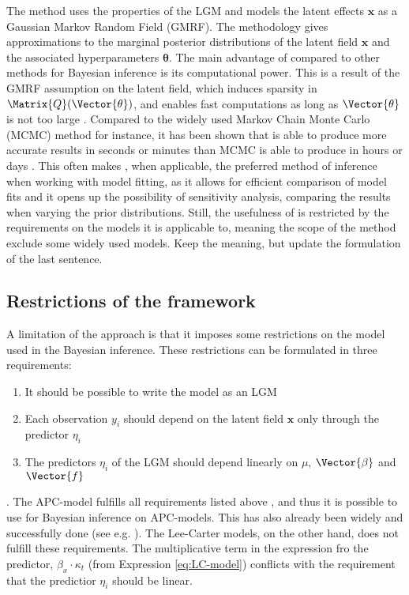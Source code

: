 \newpar The \inla method uses the properties of the LGM and models the latent effects $\mathbf{x}$ as a Gaussian Markov Random Field (GMRF). The methodology gives approximations to the marginal posterior distributions of the latent field $\mathbf{x}$ and the associated hyperparameters $\boldsymbol{\theta}$. The main advantage of \inla compared to other methods for Bayesian inference is its computational power. This is a result of the GMRF assumption on the latent field, which induces sparsity in $\Matrix{Q}(\Vector{\theta})$, and enables fast computations as long as $\Vector{\theta}$ is not too large \parencite{martinoRiebler2019}. Compared to the widely used Markov Chain Monte Carlo (MCMC) method for instance, it has been shown that \inla is able to produce more accurate results in seconds or minutes than MCMC is able to produce in hours or days \parencite{rue2009inla}.
This often makes \inla, when applicable, the preferred method of inference when working with model fitting, as it allows for efficient comparison of model fits and it opens up the possibility of sensitivity analysis, comparing the results when varying the prior distributions. Still, the usefulness of \inla is restricted by the requirements on the models it is applicable to, meaning the scope of the \inla method exclude some widely used models. \textcolor{myDarkGreen}{Keep the meaning, but update the formulation of the last sentence. }

\subsection{Restrictions of the \inla framework}
\label{sec:InlaRestrictions}
A limitation of the \inla approach is that it imposes some restrictions on the model used in the Bayesian inference. These restrictions can be formulated in three requirements:
\begin{enumerate}
    \item It should be possible to write the model as an LGM
    \item Each observation $y_i$ should depend on the latent field $\textbf{x}$ only through the predictor $\eta_i$ 
    \item The predictors $\eta_i$ of the LGM should depend linearly on $\mu$, $\Vector{\beta}$ and $\Vector{f}$
    \label{item:inlaRequirements}
\end{enumerate}
\parencite{martinoRiebler2019}.
\newpar The APC-model fulfills all requirements listed above \parencite{rieblerHeld2010}, and thus it is possible to use \inla for Bayesian inference on APC-models. This has also already been widely and successfully done (see e.g. \textcite{RieblerThesis2010}). The Lee-Carter models, on the other hand, does not fulfill these requirements. The multiplicative term in the expression fro the predictor, $\beta_x\cdot \kappa_t$ (from Expression \ref{eq:LC-model}) conflicts with the requirement that the predictior $\eta_i$ should be linear.  
   
